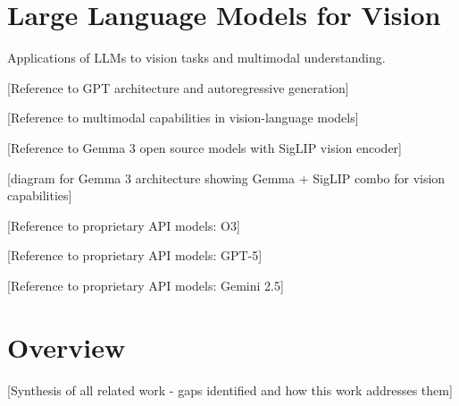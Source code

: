 \section{Large Language Models for Vision}

Applications of LLMs to vision tasks and multimodal understanding.

[Reference to GPT architecture and autoregressive generation] %

[Reference to multimodal capabilities in vision-language models] %

[Reference to Gemma 3 open source models with SigLIP vision encoder] %

[diagram for Gemma 3 architecture showing Gemma + SigLIP combo for vision capabilities]

[Reference to proprietary API models: O3] %

[Reference to proprietary API models: GPT-5] %

[Reference to proprietary API models: Gemini 2.5] %

\section{Overview}

[Synthesis of all related work - gaps identified and how this work addresses them] %